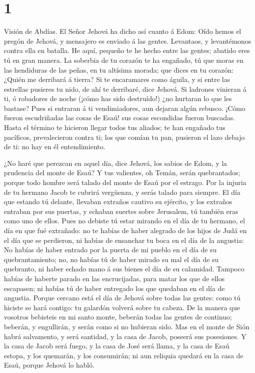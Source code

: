 \hypertarget{section}{%
\section{1}\label{section}}

 Visión de Abdías. El Señor Jehová ha dicho así cuanto á
Edom: Oído hemos el pregón de Jehová, y mensajero es enviado á las
gentes. Levantaos, y levantémonos contra ella en batalla. 
He aquí, pequeño te he hecho entre las gentes; abatido eres tú en gran
manera.  La soberbia de tu corazón te ha engañado, tú que
moras en las hendiduras de las peñas, en tu altísima morada; que dices
en tu corazón: ¿Quién me derribará á tierra?  Si te
encaramares como águila, y si entre las estrellas pusieres tu nido, de
ahí te derribaré, dice Jehová.  Si ladrones vinieran á ti, ó
robadores de noche (¡cómo has sido destruído!) ¿no hurtaran lo que les
bastase? Pues si entraran á ti vendimiadores, aun dejaran algún rebusco.
 ¡Cómo fueron escudriñadas las cosas de Esaú! sus cosas
escondidas fueron buscadas.  Hasta el término te hicieron
llegar todos tus aliados; te han engañado tus pacíficos, prevalecieron
contra ti; los que comían tu pan, pusieron el lazo debajo de ti: no hay
en él entendimiento.

 ¿No haré que perezcan en aquel día, dice Jehová, los sabios
de Edom, y la prudencia del monte de Esaú?  Y tus valientes,
oh Temán, serán quebrantados; porque todo hombre será talado del monte
de Esaú por el estrago.  Por la injuria de tu hermano Jacob
te cubrirá vergüenza, y serás talado para siempre.  El día
que estando tú delante, llevaban extraños cautivo su ejército, y los
extraños entraban por sus puertas, y echaban suertes sobre Jerusalem, tú
también eras como uno de ellos.  Pues no debiste tú estar
mirando en el día de tu hermano, el día en que fué extrañado: no te
habías de haber alegrado de los hijos de Judá en el día que se
perdieron, ni habías de ensanchar tu boca en el día de la angustia:
 No habías de haber entrado por la puerta de mi pueblo en
el día de su quebrantamiento; no, no habías tú de haber mirado su mal el
día de su quebranto, ni haber echado mano á sus bienes el día de su
calamidad.  Tampoco habías de haberte parado en las
encrucijadas, para matar los que de ellos escapasen; ni habías tú de
haber entregado los que quedaban en el día de angustia. 
Porque cercano está el día de Jehová sobre todas las gentes: como tú
hiciste se hará contigo: tu galardón volverá sobre tu cabeza.
 De la manera que vosotros bebisteis en mi santo monte,
beberán todas las gentes de continuo; beberán, y engullirán, y serán
como si no hubieran sido.  Mas en el monte de Sión habrá
salvamento, y será santidad, y la casa de Jacob, poseerá sus posesiones.
 Y la casa de Jacob será fuego, y la casa de José será
llama, y la casa de Esaú estopa, y los quemarán, y los consumirán; ni
aun reliquia quedará en la casa de Esaú, porque Jehová lo habló.

